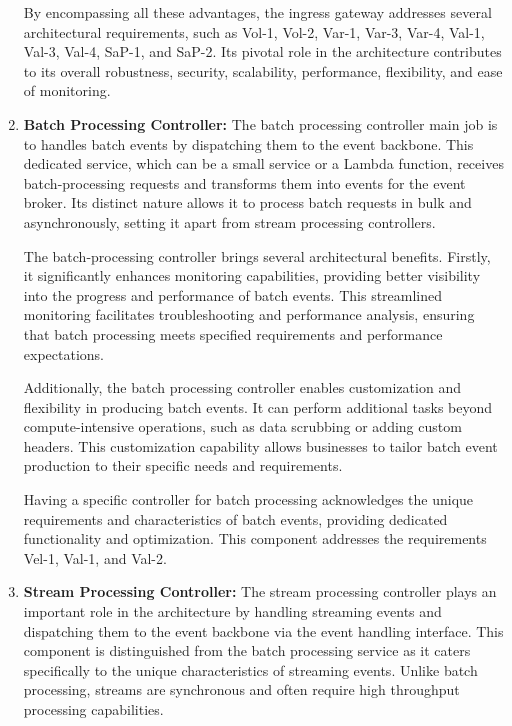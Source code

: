 \documentclass[preprint,12pt]{elsarticle}
\begin{document}
\begin{enumerate}
    By encompassing all these advantages, the ingress gateway addresses several architectural requirements, such as Vol-1, Vol-2, Var-1, Var-3, Var-4, Val-1, Val-3, Val-4, SaP-1, and SaP-2. Its pivotal role in the architecture contributes to its overall robustness, security, scalability, performance, flexibility, and ease of monitoring.

    \item \textbf{Batch Processing Controller:} The batch processing controller main job is to handles batch events by dispatching them to the event backbone. This dedicated service, which can be a small service or a Lambda function, receives batch-processing requests and transforms them into events for the event broker. Its distinct nature allows it to process batch requests in bulk and asynchronously, setting it apart from stream processing controllers.

    The batch-processing controller brings several architectural benefits. Firstly, it significantly enhances monitoring capabilities, providing better visibility into the progress and performance of batch events. This streamlined monitoring facilitates troubleshooting and performance analysis, ensuring that batch processing meets specified requirements and performance expectations.
    
    Additionally, the batch processing controller enables customization and flexibility in producing batch events. It can perform additional tasks beyond compute-intensive operations, such as data scrubbing or adding custom headers. This customization capability allows businesses to tailor batch event production to their specific needs and requirements.
    
    Having a specific controller for batch processing acknowledges the unique requirements and characteristics of batch events, providing dedicated functionality and optimization. This component addresses the requirements Vel-1, Val-1, and Val-2.
    
    \item \textbf{Stream Processing Controller:} The stream processing controller plays an important role in the architecture by handling streaming events and dispatching them to the event backbone via the event handling interface. This component is distinguished from the batch processing service as it caters specifically to the unique characteristics of streaming events. Unlike batch processing, streams are synchronous and often require high throughput processing capabilities.


\end{enumerate}
\end{document}
